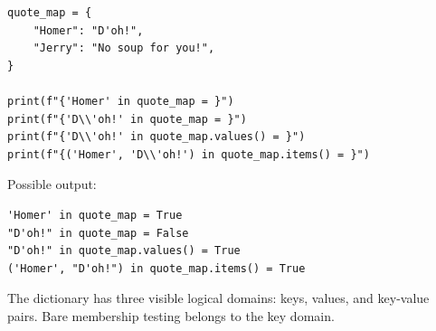 \begin{verbatim}
quote_map = {
    "Homer": "D'oh!",
    "Jerry": "No soup for you!",
}

print(f"{'Homer' in quote_map = }")
print(f"{'D\\'oh!' in quote_map = }")
print(f"{'D\\'oh!' in quote_map.values() = }")
print(f"{('Homer', 'D\\'oh!') in quote_map.items() = }")
\end{verbatim}

Possible output:

\begin{verbatim}
'Homer' in quote_map = True
"D'oh!" in quote_map = False
"D'oh!" in quote_map.values() = True
('Homer', "D'oh!") in quote_map.items() = True
\end{verbatim}

The dictionary has three visible logical domains: keys, values, and key-value pairs. Bare membership testing belongs to the key domain.